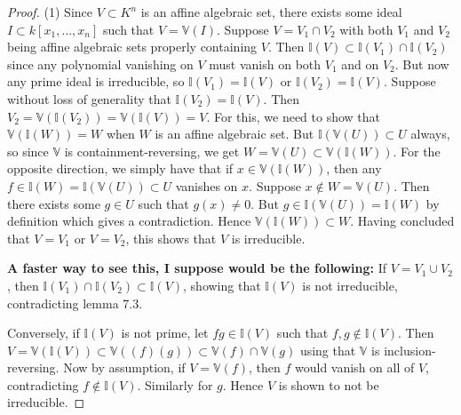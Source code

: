 \documentclass[reqno]{amsart}
\theoremstyle{definition}
\theoremstyle{remark}
\begin{document}
    \begin{proof}
        (1) Since $V \subset K^{n}$ is an affine
        algebraic set, there exists
        some ideal $I \subset k\left[ x_1, \ldots,
        x_n\right] $ such that
        $V = \mathbb{V}(I)$.
        Suppose
        $V = V_1 \cap V_2$ with
        both $V_1$ and $V_2$ being affine
        algebraic sets properly containing
        $V$.
        Then
        $\mathbb{I}(V) \subset
        \mathbb{I}(V_1) \cap \mathbb{I}(V_2)$ since
        any polynomial vanishing on $V$ must vanish on
        both $V_1$ and on $V_2$. But now any
        prime ideal is irreducible, so
        $\mathbb{I}(V_1) = \mathbb{I}(V)$  or
        $\mathbb{I}(V_2) = \mathbb{I}(V)$.
        Suppose without loss
        of generality that
        $\mathbb{I}(V_2) = \mathbb{I}(V)$. Then
        $V_2 = \mathbb{V} (\mathbb{I}(V_2)) =
        \mathbb{V} (\mathbb{I}(V)) = V$.
        For this, we need to show that
        $\mathbb{V} \left( \mathbb{I} (W) \right)
        = W$ when $W$ is an affine algebraic set.
        But $\mathbb{I} \left( \mathbb{V}(U) \right)
        \subset U$ always, so since
        $\mathbb{V}$ is containment-reversing, we get
        $W = \mathbb{V}(U) \subset
        \mathbb{V} \left( \mathbb{I} (W) \right) $.
        For the opposite direction, we simply have
        that if
        $x \in \mathbb{V} \left( \mathbb{I}(W) \right) $, then
        any $f \in \mathbb{I}(W)
        = \mathbb{I}\left( \mathbb{V}(U) \right)
        \subset U$ vanishes on
        $x$. Suppose
        $x \not\in W = \mathbb{V}(U)$.
        Then there exists some $g \in U$ such that
        $g(x) \neq 0$. But
        $g \in \mathbb{I} \left( \mathbb{V}
        (U) \right) = \mathbb{I}(W)$ by definition
        which gives a contradiction.
        Hence
        $\mathbb{V}\left( \mathbb{I}(W) \right)
        \subset W$.
        Having concluded that
        $V = V_1$ or $V = V_2$, this shows that
        $V$ is irreducible.\\
        \linebreak

        \textbf{A faster way to see this, I suppose
        would be the following:}
        If $V = V_1 \cup  V_2$, then
        $\mathbb{I}(V_1) \cap
        \mathbb{I}(V_2) \subset
        \mathbb{I}(V)$, showing that
        $\mathbb{I}(V)$ is not irreducible, contradicting
        lemma 7.3.\\
        \linebreak

        Conversely, if
        $\mathbb{I}(V)$ is not prime, let
        $fg \in \mathbb{I}(V)$ such that
        $f,g \not\in \mathbb{I}(V)$.
        Then
        $V =
        \mathbb{V} \left( \mathbb{I}(V) \right)
        \subset \mathbb{V}
        \left( (f) (g) \right)
        \subset \mathbb{V}(f) \cap
        \mathbb{V}(g)$ using that
        $\mathbb{V}$ is inclusion-reversing.
        Now by assumption,
        if $V = \mathbb{V}(f)$, then
        $f$ would vanish on all of $V$, contradicting
        $f \not\in \mathbb{I}(V)$. Similarly for
        $g$. Hence
        $V$ is shown to not be irreducible.






\end{proof}
\end{document}
